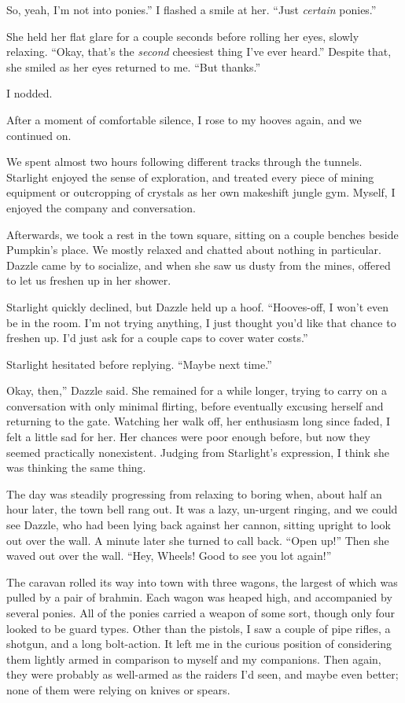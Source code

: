 \leavevmode{}So, yeah, I’m not into ponies.” I flashed a smile at her. “Just \textit{certain} ponies.”

She held her flat glare for a couple seconds before rolling her eyes, slowly relaxing. “Okay, that’s the \textit{second} cheesiest thing I’ve ever heard.” Despite that, she smiled as her eyes returned to me. “But thanks.”

I nodded.

After a moment of comfortable silence, I rose to my hooves again, and we continued on.

{\br}%
We spent almost two hours following different tracks through the tunnels. Starlight enjoyed the sense of exploration, and treated every piece of mining equipment or outcropping of crystals as her own makeshift jungle gym. Myself, I enjoyed the company and conversation.

Afterwards, we took a rest in the town square, sitting on a couple benches beside Pumpkin’s place. We mostly relaxed and chatted about nothing in particular. Dazzle came by to socialize, and when she saw us dusty from the mines, offered to let us freshen up in her shower.

Starlight quickly declined, but Dazzle held up a hoof. “Hooves-off, I won’t even be in the room. I’m not trying anything, I just thought you’d like that chance to freshen up. I’d just ask for a couple caps to cover water costs.”

Starlight hesitated before replying. “Maybe next time.”

\leavevmode{}Okay, then,” Dazzle said. She remained for a while longer, trying to carry on a conversation with only minimal flirting, before eventually excusing herself and returning to the gate. Watching her walk off, her enthusiasm long since faded, I felt a little sad for her. Her chances were poor enough before, but now they seemed practically nonexistent. Judging from Starlight’s expression, I think she was thinking the same thing.

The day was steadily progressing from relaxing to boring when, about half an hour later, the town bell rang out. It was a lazy, un-urgent ringing, and we could see Dazzle, who had been lying back against her cannon, sitting upright to look out over the wall. A minute later she turned to call back. “Open up!” Then she waved out over the wall. “Hey, Wheels! Good to see you lot again!”

The caravan rolled its way into town with three wagons, the largest of which was pulled by a pair of brahmin. Each wagon was heaped high, and accompanied by several ponies. All of the ponies carried a weapon of some sort, though only four looked to be guard types. Other than the pistols, I saw a couple of pipe rifles, a shotgun, and a long bolt-action. It left me in the curious position of considering them lightly armed in comparison to myself and my companions. Then again, they were probably as well-armed as the raiders I’d seen, and maybe even better; none of them were relying on knives or spears.

